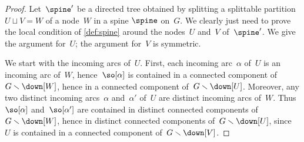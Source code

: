 \documentclass{amsart}
\theoremstyle{definition}
\newtheorem{remark}[theorem]{Remark}
\newcommand{\ssm}{\smallsetminus} %
\begin{document}

\begin{proof}
  Let~$\spine'$ be a directed tree obtained by splitting a splittable partition~$U \sqcup V = W$ of a node~$W$ in a spine $\spine$ on~$G$.
  We clearly just need to prove the local condition of \cref{def:spine} around the nodes~$U$ and~$V$ of~$\spine'$.
  We give the argument for~$U$; the argument for~$V$ is symmetric.
  
  We start with the incoming arcs of~$U$.
  First, each incoming arc~$\alpha$ of~$U$ is an incoming arc of~$W$, hence~$\so[\alpha]$ is contained in a connected component of~$G \ssm \down[W]$, hence in a connected component of~$G \ssm \down[U]$.
  Moreover, any two distinct incoming arcs~$\alpha$ and~$\alpha'$ of~$U$ are distinct incoming arcs of~$W$. Thus~$\so[\alpha]$ and~$\so[\alpha']$ are contained in distinct connected components of~$G \ssm \down[W]$, hence in distinct connected components of~$G \ssm \down[U]$, since~$U$ is contained in a connected component of~$G \ssm \down[V]$.


\end{proof}
\end{document}
